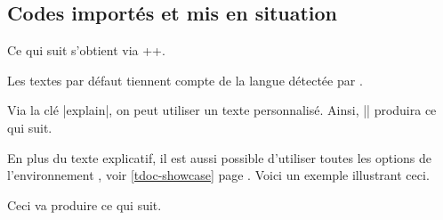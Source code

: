 \documentclass[10pt, a4paper]{../main/main}
\begin{document}
\subsection{Codes importés et mis en situation} \label{tdoc-latexshow}

\begin{tdocexa}
    Ce qui suit s'obtient via \tdocinlatex++.

    \medskip

    \begin{tdoc-doc-showcase}
    \end{tdoc-doc-showcase}
\end{tdocexa}


\begin{tdocnote}
    Les textes par défaut tiennent compte de la langue détectée par \thisproj.
\end{tdocnote}




\begin{tdocexa}
    Via la clé \tdocinlatex|explain|, on peut utiliser un texte personnalisé. Ainsi, \tdocinlatex|| produira ce qui suit.

    \medskip

    \begin{tdoc-doc-showcase}
    \end{tdoc-doc-showcase}
\end{tdocexa}




\begin{tdocexa}
    En plus du texte explicatif, il est aussi possible d'utiliser toutes les options de l'environnement , voir \ref{tdoc-showcase} page \pageref{tdoc-showcase}.
    Voici un exemple illustrant ceci.

    \medskip


    \medskip

    Ceci va produire ce qui suit.

    \medskip

    \begin{tdoc-doc-showcase}
        
    \end{tdoc-doc-showcase}
\end{tdocexa}
\end{document}
